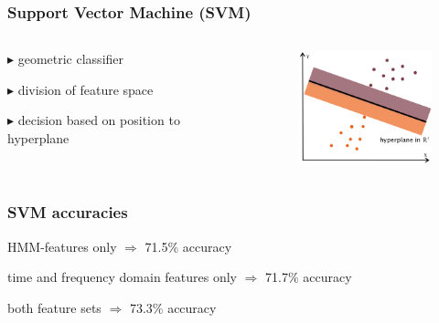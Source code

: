 \documentclass[aspectratio=43]{beamer} 	%
\begin{document}
\begin{frame}
\frametitle{Support Vector Machine (SVM)}

\begin{columns}
\begin{column}{6.5cm}
\begin{block}
{$\blacktriangleright$ geometric classifier}
\end{block}
\begin{block}
{$\blacktriangleright$ division of feature space}
\end{block}
\begin{block}
{$\blacktriangleright$ decision based on position to hyperplane}
\end{block}



\end{column}

\begin{column}{3.6cm}
\begin{figure}[!t]
\centering
\includegraphics[height=3.3cm]{svm.png}
\end{figure}
\begin{block}
{}
\end{block}
\end{column}
\end{columns}

\end{frame}












\begin{frame}
\frametitle{SVM accuracies}

\begin{block}
{HMM-features only \newline $\Rightarrow$ 71.5\% accuracy}
\end{block}

\begin{block}
{time and frequency domain features only \newline$\Rightarrow$ 71.7\% accuracy}
\end{block}

\begin{block}
{both feature sets \newline$\Rightarrow$ 73.3\% accuracy}
\end{block}

\end{frame}
\end{document}
